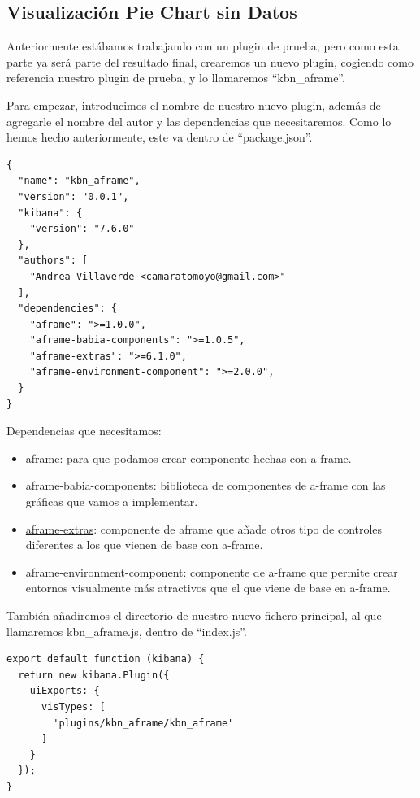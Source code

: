 \documentclass[a4paper, 12pt]{book}
\begin{document}
\subsection{Visualización Pie Chart sin Datos}

Anteriormente estábamos trabajando con un plugin de prueba; pero como esta parte ya será parte del resultado final, crearemos un nuevo plugin, cogiendo como referencia nuestro plugin de prueba, y lo llamaremos “kbn\_aframe”.

Para empezar, introducimos el nombre de nuestro nuevo plugin, además de agregarle el nombre del autor y las dependencias que necesitaremos. Como lo hemos hecho anteriormente, este va dentro de “package.json”.

\begin{lstlisting}[frame=single]
{
  "name": "kbn_aframe",
  "version": "0.0.1",
  "kibana": {
    "version": "7.6.0"
  },
  "authors": [
    "Andrea Villaverde <camaratomoyo@gmail.com>"
  ],
  "dependencies": {
    "aframe": ">=1.0.0",
    "aframe-babia-components": ">=1.0.5",
    "aframe-extras": ">=6.1.0",
    "aframe-environment-component": ">=2.0.0",
  }
}
\end{lstlisting}

Dependencias que necesitamos:
\begin{itemize}
    \item \underline{aframe}: para que podamos crear componente hechas con a-frame.
    \item \underline{aframe-babia-components}: biblioteca de componentes de a-frame con las gráficas que vamos a implementar.
    \item \underline{aframe-extras}: componente de aframe que añade otros tipo de controles diferentes a los que vienen de base con a-frame.
    \item \underline{aframe-environment-component}: componente de a-frame que permite crear entornos visualmente más atractivos que el que viene de base en a-frame.
\end{itemize}

También añadiremos el directorio de nuestro nuevo fichero principal, al que llamaremos kbn\_aframe.js, dentro de “index.js”.

\begin{lstlisting}[frame=single]
export default function (kibana) {
  return new kibana.Plugin({
    uiExports: {
      visTypes: [
        'plugins/kbn_aframe/kbn_aframe'
      ]
    }
  });
}
\end{lstlisting}
\end{document}

